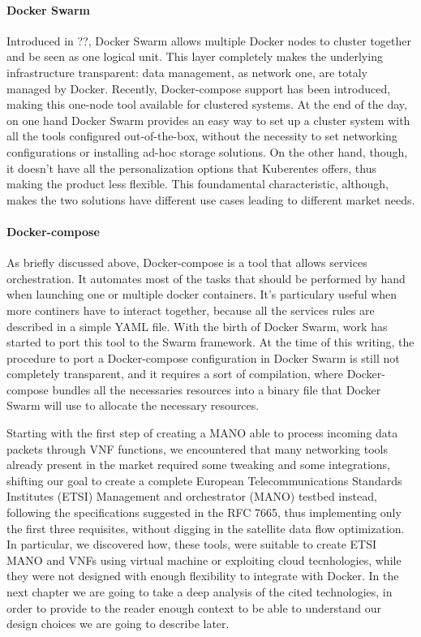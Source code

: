 \documentclass[10pt]{book}
\begin{document}
\paragraph{Docker Swarm} Introduced in ??, Docker Swarm allows multiple Docker nodes to cluster together and be
seen as one logical unit. This layer completely makes the underlying
infrastructure transparent: data management, as network one, are totaly managed
by Docker. Recently, Docker-compose support has been introduced, making
this one-node tool available for clustered systems. At the end of the day, on
one hand Docker Swarm provides an easy way to set up a cluster system with all
the tools configured out-of-the-box, without the necessity to set networking
configurations or installing ad-hoc storage solutions. On the other hand,
though, it doesn't have all the personalization options that Kuberentes offers,
thus making the product less flexible. This foundamental characteristic,
although, makes the two solutions have different use cases leading to different
market needs. 

\paragraph{Docker-compose} As briefly discussed above, Docker-compose is a tool
that allows services orchestration. It automates most of the tasks that should
be performed by hand when launching one or multiple docker containers. It's
particulary useful when more continers have to interact together,
because all the services rules are described in a simple YAML file.
With the birth of Docker Swarm, work has started to port this tool to the Swarm
framework. At the time of this writing, the procedure to port a Docker-compose
configuration in Docker Swarm is still not completely transparent, and it
requires a sort of compilation, where Docker-compose bundles all the
necessaries resources into a binary file that Docker Swarm will use to allocate
the necessary resources.

\vspace{0.5cm}

Starting with the first step of creating a MANO able to process incoming data
packets through VNF functions, we encountered that many networking tools
already present in the market required some tweaking and some integrations,
shifting our goal to create a complete  European Telecommunications Standards
Institutes (ETSI) Management and orchestrator (MANO) testbed instead, following
the specifications suggested in the RFC 7665, thus implementing only the first
three requisites, without digging in the satellite data flow optimization. In 
particular, we discovered how, these tools, were suitable to create ETSI MANO 
and VNFs using virtual machine or exploiting cloud tecnhologies, while they 
were not designed with enough flexibility to integrate with Docker. In the next 
chapter we are going to take a deep analysis of the cited technologies, in 
order to provide to the reader enough context to be able to understand our 
design choices we are going to describe later.
\end{document}
